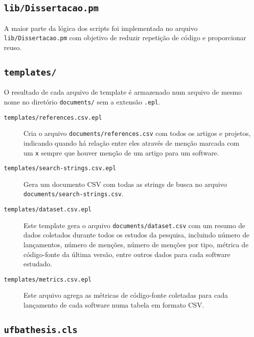 \subsection{\texttt{lib/Dissertacao.pm}}

A maior parte da lógica dos scripts foi implementada no arquivo
\texttt{lib/Dissertacao.pm} com objetivo de reduzir repetição de código e
proporcionar reuso.

\subsection{\texttt{templates/}}

O resultado de cada arquivo de template é armazenado num arquivo de mesmo nome
no diretório \texttt{documents/} sem a extensão \texttt{.epl}.

\begin{description}

  \item [\texttt{templates/references.csv.epl}]
    Cria o arquivo \texttt{documents/references.csv} com todos os artigos e
    projetos, indicando quando há relação entre eles através de menção marcada
    com um \texttt{x} sempre que houver menção de um artigo para um software.

  \item [\texttt{templates/search-strings.csv.epl}]
    Gera um documento CSV com todas as strings de busca no arquivo
    \texttt{documents/search-strings.csv}.

  \item [\texttt{templates/dataset.csv.epl}]
    Este template gera o arquivo \texttt{documents/dataset.csv} com um resumo de
    dados coletados durante todos os estudos da pesquisa, incluindo número de lançamentos,
    número de menções, número de menções por tipo, métrica de código-fonte da última
    versão, entre outros dados para cada software estudado.

  \item [\texttt{templates/metrics.csv.epl}]
    Este arquivo agrega as métricas de código-fonte coletadas para cada lançamento
    de cada software numa tabela em formato CSV.

\end{description}

\subsection{\texttt{ufbathesis.cls}}

